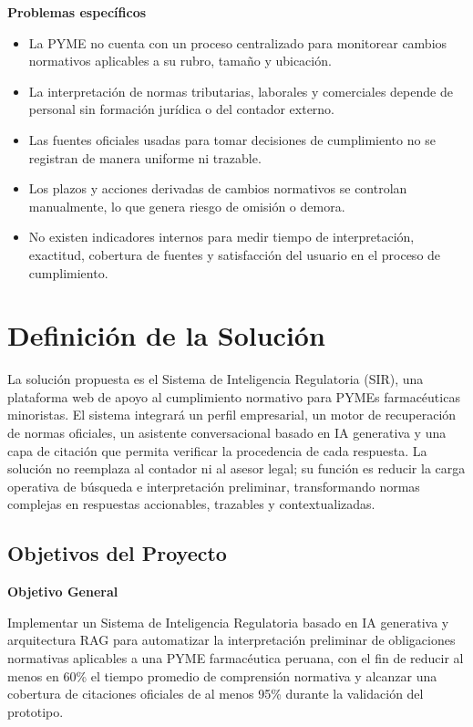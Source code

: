 \documentclass[12pt,a4paper,oneside]{report}
\begin{document}
\textbf{Problemas específicos}

\begin{itemize}
\item La PYME no cuenta con un proceso centralizado para monitorear cambios normativos aplicables a su rubro, tamaño y ubicación.
\item La interpretación de normas tributarias, laborales y comerciales depende de personal sin formación jurídica o del contador externo.
\item Las fuentes oficiales usadas para tomar decisiones de cumplimiento no se registran de manera uniforme ni trazable.
\item Los plazos y acciones derivadas de cambios normativos se controlan manualmente, lo que genera riesgo de omisión o demora.
\item No existen indicadores internos para medir tiempo de interpretación, exactitud, cobertura de fuentes y satisfacción del usuario en el proceso de cumplimiento.
\end{itemize}

\section{Definición de la Solución}\label{sec:definicion-de-la-solucion}

La solución propuesta es el Sistema de Inteligencia Regulatoria (SIR), una plataforma web de apoyo al cumplimiento normativo para PYMEs farmacéuticas minoristas. El sistema integrará un perfil empresarial, un motor de recuperación de normas oficiales, un asistente conversacional basado en IA generativa y una capa de citación que permita verificar la procedencia de cada respuesta. La solución no reemplaza al contador ni al asesor legal; su función es reducir la carga operativa de búsqueda e interpretación preliminar, transformando normas complejas en respuestas accionables, trazables y contextualizadas.

\subsection{Objetivos del Proyecto}\label{subsec:objetivos-del-proyecto}

\textbf{Objetivo General}

Implementar un Sistema de Inteligencia Regulatoria basado en IA generativa y arquitectura RAG para automatizar la interpretación preliminar de obligaciones normativas aplicables a una PYME farmacéutica peruana, con el fin de reducir al menos en 60\% el tiempo promedio de comprensión normativa y alcanzar una cobertura de citaciones oficiales de al menos 95\% durante la validación del prototipo.
\end{document}
